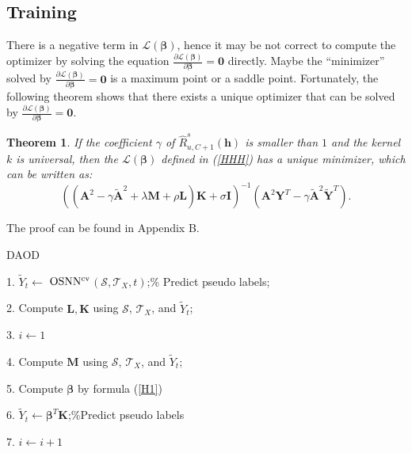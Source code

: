 \documentclass[journal]{IEEEtran}
\newtheorem{theorem}{\textbf{Theorem}}
\begin{document}
\subsection{Training} 
There is a negative term in $\mathcal{L}({\bm \beta})$, hence it may be not correct to compute the optimizer by solving the equation $\frac{\partial \mathcal{L}({\bm \beta})}{\partial {\bm \beta}}=\mathbf{0}$ directly. Maybe the ``minimizer'' solved by $\frac{\partial \mathcal{L}({\bm \beta})}{\partial {\bm \beta}}=\mathbf{0}$ is a maximum point or a saddle point. Fortunately, the following {theorem} shows that there exists a unique optimizer that can be solved by $\frac{\partial \mathcal{L}({\bm \beta})}{\partial {\bm \beta}}=\mathbf{0}$.
\begin{theorem}\label{HH}
If the coefficient $\gamma$ of $\widehat{R}^s_{u,C+1}({\bm h})$  is smaller than $1$ and the kernel $k$ is universal, then the $\mathcal{L}({\bm \beta})$ defined in (\ref{HHH}) has a unique minimizer, which can be written as:
\begin{equation}\label{H1}
    \left((\mathbf{A}^2-\gamma\mathbf{\widetilde{A}}^2+\lambda \mathbf{M} +\rho \mathbf{L})\mathbf{K}+\sigma \mathbf{I}\right)^{-1}(\mathbf{A}^2\mathbf{Y}^T-\gamma\mathbf{\widetilde{A}}^2\mathbf{\widetilde{Y}}^T).
\end{equation}
\end{theorem}

The proof can be found in Appendix B.

 \begin{algorithm} [t]
     \caption{DAOD} 
      
       1. $\widetilde{Y}_t\leftarrow ${ $\rm OSNN^{cv}$}$ (\mathcal{S},\mathcal{T}_X,t)$;\% Predict pseudo labels;\
       
       2. Compute $\mathbf{L,K}$ using $\mathcal{S}$, $\mathcal{T}_X$, and $\widetilde{Y}_t$;
       
       3. $i\leftarrow 1$\;
        
      
      
       
        { 
        4. Compute $\mathbf{M}$ using $\mathcal{S}$, $\mathcal{T}_X$, and $\widetilde{Y}_t$;
      
        5. Compute ${\bm \beta}$ by formula (\ref{H1})\;
        
        6. $\widetilde{Y}_{t}\leftarrow {\bm \beta}^T \mathbf{K}$;\%Predict pseudo labels\;
    
        7. $i\leftarrow i+1$\;
       } 
\end{algorithm}
 
\end{document}
